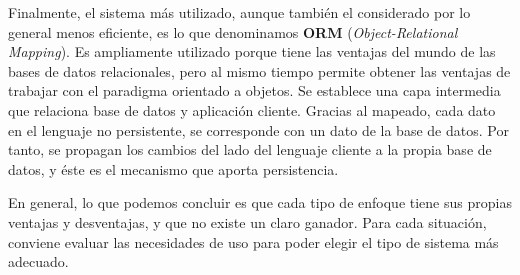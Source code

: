 \documentclass[12pt, a4paper]{article}
\begin{document}
Finalmente, el sistema más utilizado, aunque también el considerado por lo general menos eficiente, es lo que denominamos \textbf{ORM} (\textit{Object-Relational Mapping}). Es ampliamente utilizado porque tiene las ventajas del mundo de las bases de datos relacionales, pero al mismo tiempo permite obtener las ventajas de trabajar con el paradigma orientado a objetos. Se establece una capa intermedia que relaciona base de datos y aplicación cliente. Gracias al mapeado, cada dato en el lenguaje no persistente, se corresponde con un dato de la base de datos. Por tanto, se propagan los cambios del lado del lenguaje cliente a la propia base de datos, y éste es el mecanismo que aporta persistencia.

En general, lo que podemos concluir es que cada tipo de enfoque tiene sus propias ventajas y desventajas, y que no existe un claro ganador. Para cada situación, conviene evaluar las necesidades de uso para poder elegir el tipo de sistema más adecuado.

\nocite{*}

\end{document}
